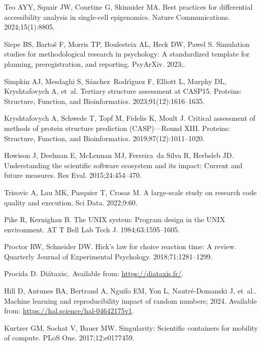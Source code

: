 \documentclass[11pt]{article}
\begin{document}
\begin{thebibliography}{10}
Teo AYY, Squair JW, Courtine G, Skinnider MA.
\newblock Best practices for differential accessibility analysis in single-cell
  epigenomics.
\newblock Nature Communications. 2024;15(1):8805.

Siepe BS, Bartoš F, Morris TP, Boulesteix AL, Heck DW, Pawel S.
\newblock Simulation studies for methodological research in psychology: A
  standardized template for planning, preregistration, and reporting.
\newblock PsyArXiv. 2023;.

Simpkin AJ, Mesdaghi S, S{\'a}nchez~Rodr{\'\i}guez F, Elliott L, Murphy DL,
  Kryshtafovych A, et~al.
\newblock Tertiary structure assessment at CASP15.
\newblock Proteins: Structure, Function, and Bioinformatics.
  2023;91(12):1616--1635.

Kryshtafovych A, Schwede T, Topf M, Fidelis K, Moult J.
\newblock Critical assessment of methods of protein structure prediction
  (CASP)—Round XIII.
\newblock Proteins: Structure, Function, and Bioinformatics.
  2019;87(12):1011--1020.

Howison J, Deelman E, McLennan MJ, Ferreira~da Silva R, Herbsleb JD.
\newblock Understanding the scientific software ecosystem and its impact:
  Current and future measures.
\newblock Res Eval. 2015;24:454--470.

Trisovic A, Lau MK, Pasquier T, Crosas M.
\newblock A large-scale study on research code quality and execution.
\newblock Sci Data. 2022;9:60.

Pike R, Kernighan B.
\newblock The {UNIX} system: Program design in the {UNIX} environment.
\newblock AT T Bell Lab Tech J. 1984;63:1595--1605.

Proctor RW, Schneider DW.
\newblock Hick’s law for choice reaction time: A review.
\newblock Quarterly Journal of Experimental Psychology. 2018;71:1281--1299.

Procida D. Diátaxis;.
\newblock Available from: \url{https://diataxis.fr/}.

Hill D, Antunes BA, Bertrand A, Nguifo EM, Yon L, Nautré-Domanski J, et~al..
  Machine learning and reproducibility impact of random numbers; 2024.
\newblock Available from: \url{https://hal.science/hal-04642175v1}.

Kurtzer GM, Sochat V, Bauer MW.
\newblock Singularity: Scientific containers for mobility of compute.
\newblock PLoS One. 2017;12:e0177459.


\end{thebibliography}
\end{document}

